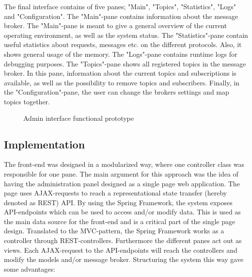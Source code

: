 The final interface contains of five panes; "Main", "Topics", "Statistics", "Logs" and "Configuration". The "Main"-pane contains information about the message broker. The "Main"-pane is meant to give a general overview of the current operating environment, as well as the system status. The "Statistics"-pane contain useful statistics about requests, messages etc. on the different protocols. Also, it shows general usage of the memory. The "Logs"-pane contains runtime logs for debugging purposes. The "Topics"-pane shows all registered topics in the message broker. In this pane, information about the current topics and subscriptions is available, as well as the possibility to remove topics and subscribers. Finally, in the "Configuration"-pane, the user can change the brokers settings and map topics together.

\begin{center}
  \begin{figure}[ht!]
    \caption{Admin interface functional prototype}
    \label{fig:initial_prototype}
  \end{figure}
\end{center}

\subsection{Implementation}
\label{subsec:architecture_and_implementation-implementation}

The front-end was designed in a modularized way, where one controller class was responsible for one pane. The main argument for this approach was the idea of having the administration panel designed as a single page web application. The page uses AJAX-requests to reach a representational state transfer (hereby denoted as REST) API. By using the Spring Framework, the system exposes API-endpoints which can be used to access and/or modify data. This is used as the main data source for the front-end and is a critical part of the single page design. Translated to the MVC-pattern, the Spring Framework works as a controller through REST-controllers. Furthermore the different panes act out as views. Each AJAX-request to the API-endpoints will reach the controllers and modify the models and/or message broker. Structuring the system this way gave some advantages: 

